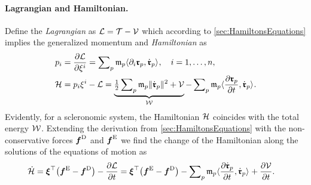 \paragraph{Lagrangian and Hamiltonian.}
Define the \textit{Lagrangian} as $\Lagrangian = \kineticEnergy - \potentialEnergy$ which according to \autoref{sec:HamiltonsEquations} implies the generalized momentum and \textit{Hamiltonian} as
\begin{align}
 \genMomentumCoeff{\LidxI} &= \pdiff[\Lagrangian]{\sysVelCoeff{\LidxI}} = \sumParticles \particleMass{\PidxI} \sProd{\dirDiff{\LidxI} \particlePos{\PidxI}}{\particlePosd{\PidxI}}, \quad \LidxI = 1,\ldots,\dimConfigSpace,
\\
 \Hamiltonian &= \genMomentumCoeff{\LidxI} \sysVelCoeff{\LidxI} - \Lagrangian = \underbrace{\tfrac{1}{2} \sumParticles \particleMass{\PidxI} \norm{\particlePosd{\PidxI}}^2 + \potentialEnergy}_{\totalEnergy} - \sumParticles \particleMass{\PidxI} \sProd{\pdiff[\particlePos{\PidxI}]{t}}{\particlePosd{\PidxI}} 
 .
\end{align}
Evidently, for a scleronomic system, the Hamiltonian $\Hamiltonian$ coincides with the total energy $\totalEnergy$. 
Extending the derivation from \autoref{sec:HamiltonsEquations} with the non-conservative forces $\genForceDiss$ and $\genForceEx$ we find the change of the Hamiltonian along the solutions of the equations of motion as
\begin{align}
 \dot{\Hamiltonian} &=  \sysVel^\top \big( \genForceEx - \genForceDiss \big) - \pdiff[\Lagrangian]{t}
 = \sysVel^\top \big( \genForceEx - \genForceDiss \big) - \sumParticles \particleMass{\PidxI} \sProd{\pdiff[\particlePosd{\PidxI}]{t}}{\particlePosd{\PidxI}} + \pdiff[\potentialEnergy]{t}
 .
\end{align}
